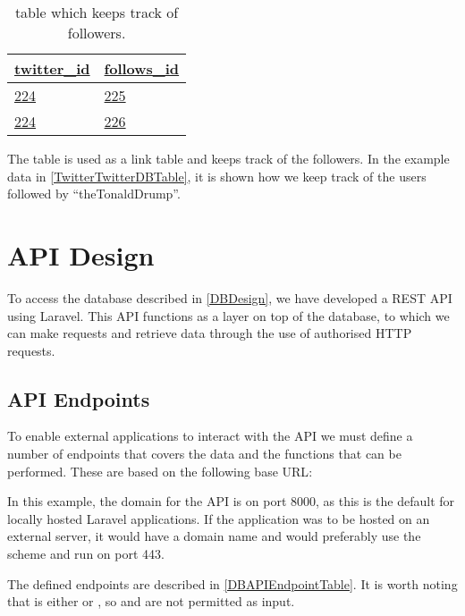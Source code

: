 \begin{table}[H]
\centering
\begin{tabular}{| l | l |}
\hline
\textbf{\underline{twitter\_id}} & \textbf{\underline{follows\_id}} \\
\hline
\underline{224} & \underline{225} \\
\hline
\underline{224} & \underline{226} \\
\hline
\end{tabular}
\caption{ table which keeps track of followers.}
\label{TwitterTwitterDBTable}
\end{table}

The table  is used as a link table and keeps track
of the followers. In the example data in \autoref{TwitterTwitterDBTable}, it is 
shown how we keep track of the users followed by ``theTonaldDrump''.

\section{\acs{API} Design}\label{sec:APIDesign}
To access the database described in \autoref{DBDesign}, we have
developed a \ac{REST} \ac{API} using Laravel. This
\ac{API} functions as a layer on top of the database, to which we can make
requests and retrieve data through the use of authorised \ac{HTTP} requests.

\subsection{\acs{API} Endpoints}
To enable external applications to interact with the \ac{API} we must
define a number of endpoints that covers the data and the functions that can be
performed. These are based on the following base \ac{URL}:\nl

\nl

In this example, the domain for the \ac{API} is  on port 8000,
as this is the default for locally hosted Laravel applications. If the application was to
be hosted on an external server, it would have a domain name and would
preferably use the  scheme and run on port 443.\nl

The defined endpoints are described in \autoref{DBAPIEndpointTable}. It is worth
noting that  is either  or , so  and
 are not permitted as input. 

